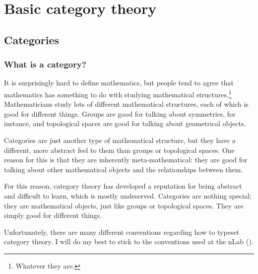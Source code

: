 \documentclass[main.tex]{subfiles}
\begin{document}
\chapter{Basic category theory}\label{ch:categories}

\section{Categories}\label{sec:categoriesbasicdefinitions}

\subsection{What is a category?}

It is surprisingly hard to define mathematics, but people tend to agree that mathematics has something to do with studying mathematical structures.\footnote{Whatever they are.} Mathematicians study lots of different mathematical structures, each of which is good for different things. Groups are good for talking about symmetries, for instance, and topological spaces are good for talking about geometrical objects.

Categories are just another type of mathematical structure, but they have a different, more abstract feel to them than groups or topological spaces. One reason for this is that they are inherently meta-mathematical: they are good for talking about other mathematical objects and the relationships between them.

For this reason, category theory has developed a reputation for being abstract and difficult to learn, which is mostly undeserved. Categories are nothing special; they are mathematical objects, just like groups or topological spaces. They are simply good for different things.

Unfortunately, there are many different conventions regarding how to typeset category theory. I will do my best to stick to the conventions used at the nLab (\cite{nlab}).
\end{document}
